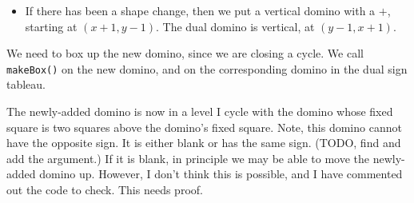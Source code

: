\documentclass[12pt]{article}
\numberwithin{equation}{section}
\newcommand{\horizontalDominoMaybe}[3]{\filldraw [dominoMaybeStyle] (#2 - 1 + \eps, #1 - 1 + \eps) rectangle + (2 - \teps, 1 -\teps) node [dominoText] {$#3$};}
\newcommand{\horizontalDominoMaybeShift}[4]{\filldraw [dominoMaybeStyle] (#2 - 1 + #4 + \eps, #1 - 1 + \eps) rectangle + (2 - \teps, 1 -\teps) node [dominoText] {$#3$};}
\newcommand{\verticalDominoMaybeShift}[4]{\filldraw [dominoMaybeStyle] (#2 - 1 + #4 + \eps,  #1 - 1 + \eps) rectangle + (1 - \teps,2 -\teps) node [dominoText] {$#3$};}
\begin{document}
\begin{itemize}
\begin{itemize}
\begin{figure}[H]
     \end{figure}
     \item  If there has been a shape change, then we put a vertical domino with a $+$, starting at $(x + 1, y - 1)$.
     The dual domino is vertical, at $(y - 1, x + 1)$.
   \end{itemize}
   We need to box up the new domino, since we are closing a cycle.
   We call \texttt{makeBox()} on the new domino, and on the corresponding domino in the dual sign tableau.

   The newly-added domino is now in a level I cycle with the domino whose fixed square is two squares above the domino's fixed square.
   Note, this domino cannot have the opposite sign.
   It is either blank or has the same sign.
   (TODO, find and add the argument.)
   If it is blank, in principle we may be able to move the newly-added domino up.
   However, I don't think this is possible, and I have commented out the code to check.
   This needs proof.
   \begin{figure}[H]
     \centering
   \end{figure}


\end{itemize}
\end{document}
